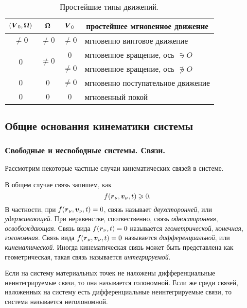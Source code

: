 \begin{table}[h]
    \centering
    \caption{Простейшие типы движений.}
        \begin{tabular}{cccl}
    \toprule
            $(\mbox{\boldmath $V$}_0, \mbox{\boldmath $\Omega$})$ & $\mbox{\boldmath $\Omega$}$ & $\mbox{\boldmath $V$}_0$ & \multicolumn{1}{c}{простейшее мгновенное движение}\\
    \midrule
            $\neq 0$ & $\neq 0$ & $\neq 0$ 
            & мгновенно винтовое движение\\
            \multirow{2}{*}{$0$} & \multirow{2}{*}{$\neq 0$} & 0 
            & мгновенное вращение, ось $\ni O$\\
            && $\neq 0$ & мгновенное вращение, ось $\not \ni O$ \\
            $0$ & $0$ & $\neq 0$ 
            & мгновенно поступательное движение \\
            $0$ & $0$ & $0$ 
            & мгновенный покой \\
    \bottomrule
        \end{tabular}
    \label{tab:}
\end{table}


\subsection{Общие основания кинематики системы}

\subsubsection*{Свободные и несвободные системы. Связи.}

Рассмотрим некоторые частные случаи кинематических связей в системе.


В общем случае связь запишем, как
$$
    f(\mbox{\boldmath $r$}_\nu, \mbox{\boldmath $v$}_\nu, t) \geqslant 0.
$$
В частности, при $f(\mbox{\boldmath $r$}_\nu, \mbox{\boldmath $v$}_\nu, t) = 0$, связь называет \textit{двухсторонней}, или \textit{удерживающей}. При неравенстве, соотвественно, связь \textit{односторонняя}, \textit{освобождающая}.
Связь вида $f(\mbox{\boldmath $r$}_\nu, t) = 0$ называется \textit{геометрической}, \textit{конечная}, \textit{голономная}. Связь вида $f(\mbox{\boldmath $r$}_\nu, \mbox{\boldmath $v$}_\nu, t) = 0$ называется \textit{дифференциальной}, или \textit{кинематической}. Иногда кинематическая связь может быть представлена как геометрическая, такая связь называется \textit{интегрируемой}. 

\begin{to_def} 
     Если на систему материальных точек не наложены дифференциальные неинтегрируемые связи, то она называется голономной. Если же среди связей, наложенных на систему есть дифференциальные неинтегрируемые связи, то система называется неголономной.
\end{to_def}

